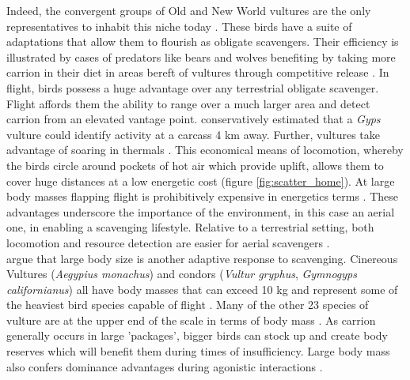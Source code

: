 Indeed, the convergent groups of Old and New World vultures are the only representatives to inhabit this niche today \citep{houston2001condors}. These birds have a suite of adaptations that allow them to flourish as obligate scavengers. Their efficiency is illustrated by cases of predators like bears and wolves benefiting by taking more carrion in their diet in areas bereft of vultures through competitive release \citep{devault2003scavenging}. In flight, birds possess a huge advantage over any terrestrial obligate scavenger. Flight affords them the ability to range over a much larger area and detect carrion from an elevated vantage point. \cite{pennycuick1972soaring} conservatively estimated that a \textit{Gyps} vulture could identify activity at a carcass 4 km away. Further, vultures take advantage of soaring in thermals \citep{mundy1992vultures}. This economical means of locomotion, whereby the birds circle around pockets of hot air which provide uplift, allows them to cover huge distances at a low energetic cost (figure \ref{fig:scatter_home}). At large body masses flapping flight is prohibitively expensive in energetics terms \citep{hedenstrom1993migration}. These advantages underscore the importance of the environment, in this case an aerial one, in enabling a scavenging lifestyle. Relative to a terrestrial setting, both locomotion and resource detection are easier for aerial scavengers \citep{tucker1975energetic,ruxton2004obligate}. \\ \indent
\cite{ruxton2004obligate} argue that large body size is another adaptive response to scavenging. Cinereous Vultures (\textit{Aegypius monachus}) and condors (\textit{Vultur gryphus}, \textit{Gymnogyps californianus}) all have body masses that can exceed 10 kg and represent some of the heaviest bird species capable of flight \citep{ferguson2001raptors,donazar2002effects}. Many of the other 23 species of vulture are at the upper end of the scale in terms of body mass \citep{ruxton2004obligate}.  As carrion generally occurs in large 'packages', bigger birds can stock up and create body reserves which will benefit them during times of insufficiency. Large body mass also confers dominance advantages during agonistic interactions \citep{kruuk1967competition,KaneVul}. \\ \indent
